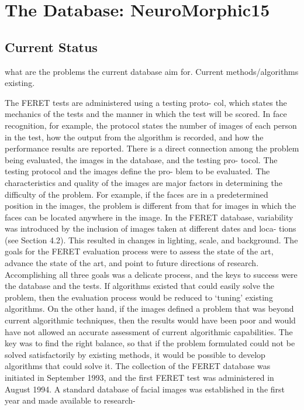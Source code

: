 \section{The Database: NeuroMorphic15}
\label{sec:data}
\subsection{Current Status}
what are the problems the current database aim for.
Current methods/algorithms existing.


The FERET tests are administered using a testing proto-
col, which states the mechanics of the tests and the manner
in which the test will be scored. In face recognition, for
example, the protocol states the number of images of each
person in the test, how the output from the algorithm is
recorded, and how the performance results are reported.
There is a direct connection among the problem being
evaluated, the images in the database, and the testing pro-
tocol. The testing protocol and the images define the pro-
blem to be evaluated. The characteristics and quality of the
images are major factors in determining the difficulty of the
problem. For example, if the faces are in a predetermined
position in the images, the problem is different from that for
images in which the faces can be located anywhere in the
image. In the FERET database, variability was introduced
by the inclusion of images taken at different dates and loca-
tions (see Section 4.2). This resulted in changes in lighting,
scale, and background.
The goals for the FERET evaluation process were to assess
the state of the art, advance the state of the art, and point to
future directions of research. Accomplishing all three goals
was a delicate process, and the keys to success were the
database and the tests. If algorithms existed that could easily
solve the problem, then the evaluation process would be
reduced to ‘tuning’ existing algorithms. On the other hand,
if the images defined a problem that was beyond current
algorithmic techniques, then the results would have been
poor and would have not allowed an accurate assessment of
current algorithmic capabilities. The key was to find the right
balance, so that if the problem formulated could not be solved
satisfactorily by existing methods, it would be possible to
develop algorithms that could solve it.
The collection of the FERET database was initiated in
September 1993, and the first FERET test was administered
in August 1994. A standard database of facial images was
established in the first year and made available to research-
